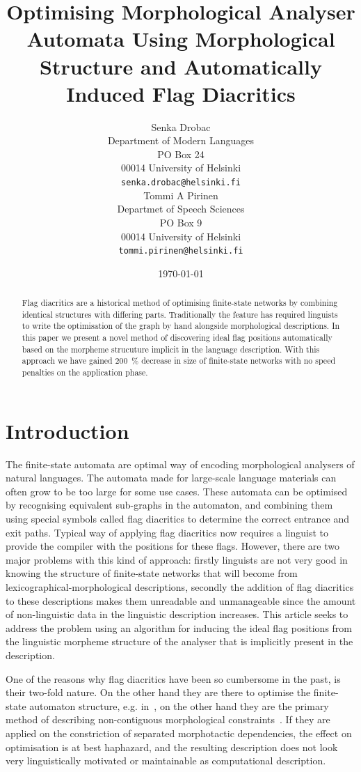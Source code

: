 \documentclass[11pt]{article}
\title{Optimising Morphological Analyser Automata Using Morphological Structure
and Automatically Induced Flag Diacritics}
\author{Senka Drobac \\
Department of Modern Languages \\
PO Box 24 \\
00014 University of Helsinki \\
  {\tt senka.drobac@helsinki.fi} \\\And
  Tommi A Pirinen \\
Departmet of Speech Sciences\\
PO Box 9\\
00014 University of Helsinki\\
  {\tt tommi.pirinen@helsinki.fi} \\}
\date{\today}
\begin{document}
\maketitle
\begin{abstract}
    Flag diacritics are a historical method of optimising finite-state networks
    by combining identical structures with differing parts. Traditionally the
    feature has required linguists to write the optimisation of the graph by
    hand alongside morphological descriptions. In this paper we present a novel
    method of discovering ideal flag positions automatically based on the
    morpheme strucuture implicit in the language description. With this
    approach we have gained 200~\% decrease in size of finite-state networks
    with no speed penalties on the application phase.
\end{abstract}

\section{Introduction}

The finite-state automata are optimal way of encoding morphological analysers
of natural languages. The automata made for large-scale language materials can
often grow to be too large for some use cases. These automata can be optimised
by recognising equivalent sub-graphs in the automaton, and combining them using
special symbols called flag diacritics to determine the correct entrance and
exit paths. Typical way of applying flag diacritics now requires a linguist to
provide the compiler with the positions for these flags. However, there are two
major problems with this kind of approach: firstly linguists are not very good
in knowing the structure of finite-state networks that will become from
lexicographical-morphological descriptions, secondly the addition of flag
diacritics to these descriptions makes them unreadable and unmanageable since
the amount of non-linguistic data in the linguistic description increases. This
article seeks to address the problem using an algorithm for inducing the ideal
flag positions from the linguistic morpheme structure of the analyser that is
implicitly present in the description. 

One of the reasons why flag diacritics have been so cumbersome in the past,
is their two-fold nature. On the other hand they are there to optimise the
finite-state automaton structure, e.g. in~\cite{karttunen2006numbers}, on the
other hand they are the primary method of describing non-contiguous 
morphological constraints~\cite{beesley1998constraining}. If they are applied
on the constriction of separated morphotactic dependencies, the effect on
optimisation is at best haphazard, and the resulting description does not
look very linguistically motivated or maintainable as computational description.
\end{document}
